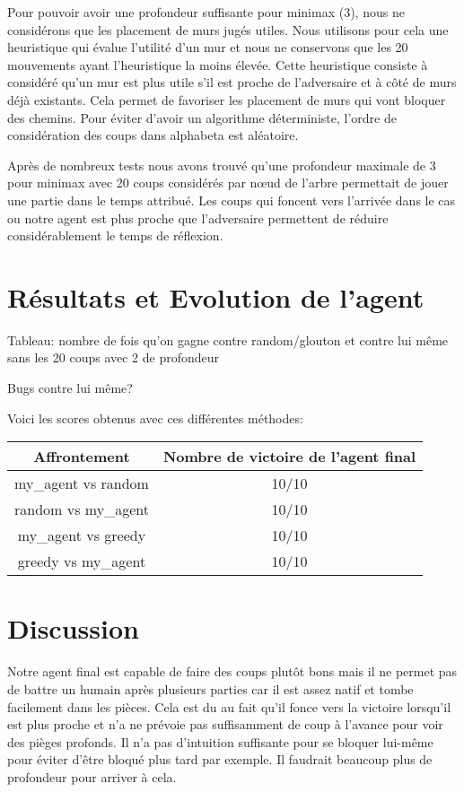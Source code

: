\documentclass[12pt]{article}
\begin{document}
Pour pouvoir avoir une profondeur suffisante pour minimax (3), nous ne considérons que les placement de murs jugés utiles. Nous utilisons pour cela une heuristique qui évalue l'utilité d'un mur et nous ne conservons que les 20 mouvements ayant l'heuristique la moins élevée. Cette heuristique consiste à considéré qu'un mur est plus utile s'il est proche de l'adversaire et à côté de murs déjà existants. Cela permet de favoriser les placement de murs qui vont bloquer des chemins. Pour éviter d'avoir un algorithme déterministe, l'ordre de considération des coups dans alphabeta est aléatoire. 

Après de nombreux tests nous avons trouvé qu'une profondeur maximale de 3 pour minimax avec 20 coups considérés par nœud de l'arbre permettait de jouer une partie dans le temps attribué. Les coups qui foncent vers l'arrivée dans le cas ou notre agent est plus proche que l'adversaire permettent de réduire considérablement le temps de réflexion. 

\section*{Résultats et Evolution de l'agent}

Tableau: nombre de fois qu'on gagne contre random/glouton et contre lui même sans les 20 coups avec 2 de profondeur

Bugs contre lui même?

Voici les scores obtenus avec ces différentes méthodes:
\begin{center}
  \begin{tabular}{ |c|c| }
    \hline
    Affrontement & Nombre de victoire de l'agent final \\\hline\hline
    my_agent vs random & 10/10 \\\hline
    random vs my_agent & 10/10 \\\hline
    my_agent vs greedy & 10/10 \\\hline
    greedy vs my_agent & 10/10 \\\hline

  \end{tabular}
\end{center}


\section*{Discussion}

Notre agent final est capable de faire des coups plutôt bons mais il ne permet pas de battre un humain après plusieurs parties car il est assez natif et tombe facilement dans les pièces. Cela est du au fait qu'il fonce vers la victoire lorsqu'il est plus proche et n'a ne prévoie pas suffisamment de coup à l'avance pour voir des pièges profonds. Il n'a pas d'intuition suffisante pour se bloquer lui-même pour éviter d'être bloqué plus tard par exemple. Il faudrait beaucoup plus de profondeur pour arriver à cela. 
\end{document}
